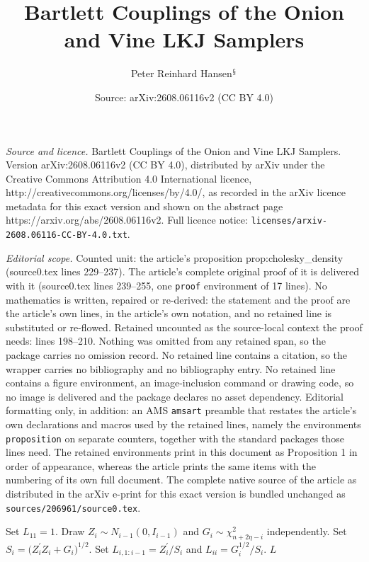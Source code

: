 \documentclass[10pt,a4paper]{amsart}
\title{Bartlett Couplings of the Onion and Vine LKJ Samplers}
\author{Peter Reinhard Hansen$^{\mathsection}$}
\date{Source: arXiv:2608.06116v2 (CC BY 4.0)}
\begin{document}
\maketitle

\noindent\emph{Source and licence.} Bartlett Couplings of the Onion and Vine LKJ Samplers. Version arXiv:2608.06116v2 (CC BY 4.0), distributed by arXiv under the Creative Commons Attribution 4.0 International licence, http://creativecommons.org/licenses/by/4.0/, as recorded in the arXiv licence metadata for this exact version and shown on the abstract page https://arxiv.org/abs/2608.06116v2. Full licence notice: \texttt{licenses/arxiv-2608.06116-CC-BY-4.0.txt}.\par\smallskip

\noindent\textit{Editorial scope.} Counted unit: the article's proposition prop:cholesky\_density (source0.tex lines 229--237). The article's complete original proof of it is delivered with it (source0.tex lines 239--255, one \texttt{proof} environment of 17 lines). No mathematics is written, repaired or re-derived: the statement and the proof are the article's own lines, in the article's own notation, and no retained line is substituted or re-flowed.  Retained uncounted as the source-local context the proof needs: lines 198--210.  Nothing was omitted from any retained span, so the package carries no omission record.  No retained line contains a citation, so the wrapper carries no bibliography and no bibliography entry.  No retained line contains a figure environment, an image-inclusion command or drawing code, so no image is delivered and the package declares no asset dependency.  Editorial formatting only, in addition: an AMS \texttt{amsart} preamble that restates the article's own declarations and macros used by the retained lines, namely the environments \texttt{proposition} on separate counters, together with the standard packages those lines need.  The retained environments print in this document as Proposition 1 in order of appearance, whereas the article prints the same items with the numbering of its own full document.  The complete native source of the article as distributed in the arXiv e-print for this exact version is bundled unchanged as \texttt{sources/206961/source0.tex}.
\begin{algorithm}[H]
\caption{Normalized-Bartlett $\operatorname{LKJ}_n(\eta)$ Cholesky sampler}
\label{alg:bartlett}
\begin{algorithmic}[1]
\State Set $L_{11}=1$.
  \State Draw $Z_i\sim N_{i-1}(0,I_{i-1})$ and $G_i\sim\chi^2_{n+2\eta-i}$ independently.
  \State Set $S_i=\bigl(Z_i^\prime Z_i+G_i\bigr)^{1/2}$.
  \State Set $L_{i,1:i-1}=Z_i^\prime/S_i$ and $L_{ii}=G_i^{1/2}/S_i$.
\EndFor
\State \Return $L$ 
\end{algorithmic}
\end{algorithm}
\end{document}
